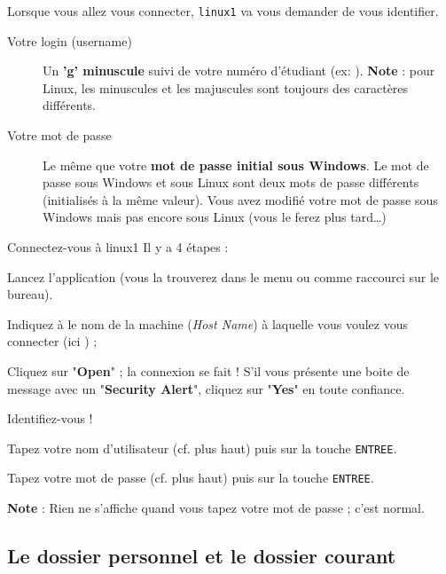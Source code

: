 \documentclass[a4paper,11pt]{style-esi/td}
\begin{document}
		Lorsque vous allez vous connecter, \verb_linux1_ va vous demander de vous identifier.

		\begin{infobox}
			\begin{description}
			\item[Votre login (username)]
				Un \textbf{'g' minuscule} suivi de votre numéro d'étudiant
				(ex: ).
				\textbf{Note} : pour Linux, les minuscules et les majuscules 
				sont toujours des caractères différents.
			\item[Votre mot de passe]
				Le même que votre \textbf{mot de passe initial sous Windows}.			
				Le mot de passe sous Windows et sous Linux sont deux mots de passe différents 
				(initialisés à la même valeur).        
				Vous avez modifié votre mot de passe sous Windows 
				mais pas encore sous Linux (vous le ferez plus tard\dots)
			\end{description}
		\end{infobox}

		\begin{Tutoriel}{Connectez-vous à linux1} 
		Il y a 4 étapes :
		\begin{steps}			
		\item 
			Lancez l'application  
			(vous la trouverez dans le menu ou comme raccourci sur le bureau).			
		\item 
			Indiquez à  le nom de la machine (\textit{Host Name}) 
			à laquelle vous voulez vous connecter (ici ) ;
		\item 
			Cliquez sur "\textbf{Open}" ; 
			la connexion se fait ! 
			S'il vous présente une boite de message avec un "\textbf{Security Alert}", 
			cliquez sur "\textbf{Yes}" en toute confiance.			
		\item 
			Identifiez-vous !
			\begin{steps}
			\item 
				Tapez votre nom d'utilisateur (cf. plus haut) 
				puis sur la touche \verb_ENTREE_. 
			\item 
				Tapez votre mot de passe (cf. plus haut) puis sur la touche \verb_ENTREE_.
				\par
				\textbf{Note} : Rien ne s'affiche quand vous tapez votre mot de passe ; c'est normal.
			\end{steps}
		\end{steps}
		\end{Tutoriel}

\newpage
	\subsection{Le dossier personnel et le dossier courant}
\end{document}
